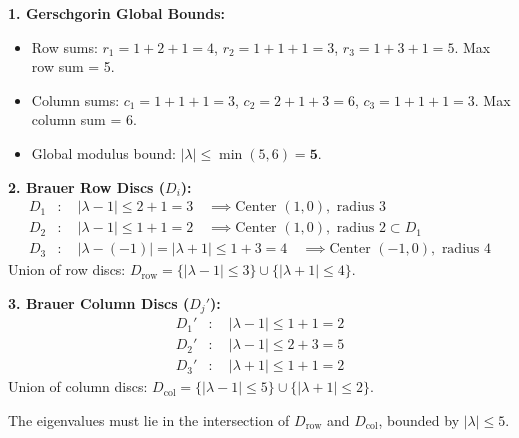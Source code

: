 \documentclass[11pt,a4paper]{article}
\begin{document}
\begin{solbox}
\textbf{1. Gerschgorin Global Bounds:}
\begin{itemize}
    \item Row sums: $r_1 = 1+2+1=4$, $r_2 = 1+1+1=3$, $r_3 = 1+3+1=5$. Max row sum = 5.
    \item Column sums: $c_1 = 1+1+1=3$, $c_2 = 2+1+3=6$, $c_3 = 1+1+1=3$. Max column sum = 6.
    \item Global modulus bound: $|\lambda| \le \min(5, 6) = \mathbf{5}$.
\end{itemize}

\textbf{2. Brauer Row Discs ($D_i$):}
\begin{align*}
    D_1&: \quad |\lambda - 1| \le 2 + 1 = 3 \quad \implies \text{Center } (1, 0), \text{ radius } 3 \\
    D_2&: \quad |\lambda - 1| \le 1 + 1 = 2 \quad \implies \text{Center } (1, 0), \text{ radius } 2 \subset D_1 \\
    D_3&: \quad |\lambda - (-1)| = |\lambda + 1| \le 1 + 3 = 4 \quad \implies \text{Center } (-1, 0), \text{ radius } 4
\end{align*}
Union of row discs: $D_{\text{row}} = \{|\lambda - 1| \le 3\} \cup \{|\lambda + 1| \le 4\}$.

\textbf{3. Brauer Column Discs ($D_j'$):}
\begin{align*}
    D_1'&: \quad |\lambda - 1| \le 1 + 1 = 2 \\
    D_2'&: \quad |\lambda - 1| \le 2 + 3 = 5 \\
    D_3'&: \quad |\lambda + 1| \le 1 + 1 = 2
\end{align*}
Union of column discs: $D_{\text{col}} = \{|\lambda - 1| \le 5\} \cup \{|\lambda + 1| \le 2\}$.

The eigenvalues must lie in the intersection of $D_{\text{row}}$ and $D_{\text{col}}$, bounded by $|\lambda| \le 5$.

\begin{center}
\end{center}
\end{solbox}
\end{document}

